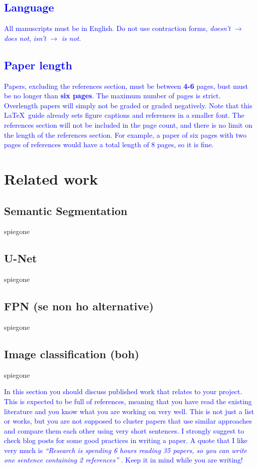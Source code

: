 \documentclass[10pt,twocolumn,letterpaper]{article}
\begin{document}
   \textcolor{blue}{
   \subsection{Language}
      All manuscripts must be in English. Do not use contraction forms, \eg \emph{doesn't} $\xrightarrow{}$ \emph{does not}, \emph{isn't} $\xrightarrow{}$ \emph{is not}. }

   \textcolor{blue}{
   \subsection{Paper length}
      Papers, excluding the references section, must be between \textbf{4-6} pages, bust must be no longer than \textbf{six pages}. The maximum number of pages is strict. Overlength papers will simply not be graded or graded negatively. Note that this \LaTeX\ guide already sets figure captions and references in a smaller font.
      The references section will not be included in the page count, and there is no limit on the length of the references section. For example, a paper of six pages with two pages of references would have a total length of 8 pages, so it is fine.}



\section{Related work}
   \subsection{Semantic Segmentation}
      spiegone
   \subsection{U-Net}
      spiegone
   \subsection{FPN (se non ho alternative)} 
      spiegone
   \subsection{Image classification (boh)}
      spiegone

\textcolor{blue}{
In this section you should discuss published work that relates to your project. This is expected to be full of references, meaning that you have read the existing literature and you know what you are working on very well. This is not just a list or works, but you are not supposed to cluster papers that use similar approaches and compare them each other using very short sentences. I strongly suggest to check \cite{steinhardt, lipton} blog posts for some good practices in writing a paper. A quote that I like very much is \emph{``Research is spending 6 hours reading 35 papers, so you can write one sentence containing 2 references''} \cite{twit:ref}. Keep it in mind while you are writing!
}
\end{document}
